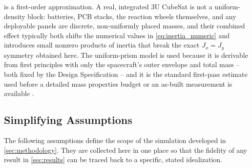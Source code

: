  is a first-order approximation. A real, integrated 3U CubeSat is not a uniform-density block: batteries, PCB stacks, the reaction wheels themselves, and any deployable panels are discrete, non-uniformly placed masses, and their combined effect typically both shifts the numerical values in \cref{eq:inertia_numeric} and introduces small nonzero products of inertia that break the exact $J_x=J_y$ symmetry obtained here. The uniform-prism model is used because it is derivable from first principles with only the spacecraft's outer envelope and total mass -- both fixed by the Design Specification -- and it is the standard first-pass estimate used before a detailed mass properties budget or an as-built measurement is available \cite{wertz1978,sidi1997}.

\subsection{Simplifying Assumptions}
\label{sec:assumptions}

The following assumptions define the scope of the simulation developed in \cref{sec:methodology}. They are collected here in one place so that the fidelity of any result in \cref{sec:results} can be traced back to a specific, stated idealization.

